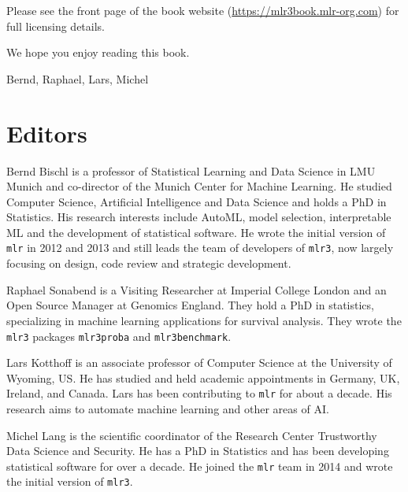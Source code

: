 \documentclass[
  letterpaper,
  krantz2]{krantz}
\begin{document}
Please see the front page of the book website
(\url{https://mlr3book.mlr-org.com}) for full licensing details.

\vspace{10mm}

We hope you enjoy reading this book.

\vspace{5mm}

Bernd, Raphael, Lars, Michel

\chapter*{Editors}

Bernd Bischl is a professor of Statistical Learning and Data Science in
LMU Munich and co-director of the Munich Center for Machine Learning. He
studied Computer Science, Artificial Intelligence and Data Science and
holds a PhD in Statistics. His research interests include AutoML, model
selection, interpretable ML and the development of statistical software.
He wrote the initial version of \texttt{mlr} in 2012 and 2013 and still
leads the team of developers of \texttt{mlr3}, now largely focusing on
design, code review and strategic development.

Raphael Sonabend is a Visiting Researcher at Imperial College London and
an Open Source Manager at Genomics England. They hold a PhD in
statistics, specializing in machine learning applications for survival
analysis. They wrote the \texttt{mlr3} packages \texttt{mlr3proba} and
\texttt{mlr3benchmark}.

Lars Kotthoff is an associate professor of Computer Science at the
University of Wyoming, US. He has studied and held academic appointments
in Germany, UK, Ireland, and Canada. Lars has been contributing to
\texttt{mlr} for about a decade. His research aims to automate machine
learning and other areas of AI.

Michel Lang is the scientific coordinator of the Research Center
Trustworthy Data Science and Security. He has a PhD in Statistics and
has been developing statistical software for over a decade. He joined
the \texttt{mlr} team in 2014 and wrote the initial version of
\texttt{mlr3}.
\end{document}
